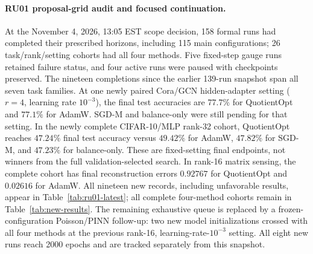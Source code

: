 \paragraph{RU01 proposal-grid audit and focused continuation.}
At the November 4, 2026, 13:05 EST scope decision, 158 formal runs had
completed their prescribed horizons, including 115 main configurations;
26 task/rank/setting cohorts had all four methods. Five fixed-step gauge
runs retained failure status, and four active runs were paused with
checkpoints preserved. The nineteen completions since the earlier
139-run snapshot span all seven task families.
At one newly paired Cora/GCN hidden-adapter setting ($r=4$,
learning rate $10^{-3}$), the final test accuracies are $77.7\%$ for
QuotientOpt and $77.1\%$ for AdamW. SGD-M and balance-only were still
pending for that setting. In the newly complete CIFAR-10/MLP rank-32
cohort, QuotientOpt reaches $47.24\%$ final test accuracy versus
$49.42\%$ for AdamW, $47.82\%$ for SGD-M, and $47.23\%$ for
balance-only. These are fixed-setting final endpoints, not winners
from the full validation-selected search. In rank-16 matrix sensing,
the complete cohort has final reconstruction errors $0.92767$ for
QuotientOpt and $0.02616$ for AdamW. All nineteen new records,
including unfavorable results, appear in Table~\ref{tab:ru01-latest};
all complete four-method cohorts remain in Table~\ref{tab:new-results}.
The remaining exhaustive queue is replaced by a frozen-configuration
Poisson/PINN follow-up: two new model initializations crossed with all
four methods at the previous rank-16, learning-rate-$10^{-3}$ setting.
All eight new runs reach 2000 epochs and are tracked separately from
this snapshot.
